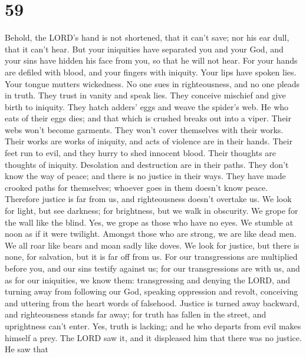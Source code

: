 \hypertarget{section-56}{%
\section{59}\label{section-56}}

 Behold, the LORD's hand is not shortened, that it can't
save; nor his ear dull, that it can't hear.  But your
iniquities have separated you and your God, and your sins have hidden
his face from you, so that he will not hear.  For your hands
are defiled with blood, and your fingers with iniquity. Your lips have
spoken lies. Your tongue mutters wickedness.  No one sues in
righteousness, and no one pleads in truth. They trust in vanity and
speak lies. They conceive mischief and give birth to iniquity.
 They hatch adders' eggs and weave the spider's web. He who
eats of their eggs dies; and that which is crushed breaks out into a
viper.  Their webs won't become garments. They won't cover
themselves with their works. Their works are works of iniquity, and acts
of violence are in their hands.  Their feet run to evil, and
they hurry to shed innocent blood. Their thoughts are thoughts of
iniquity. Desolation and destruction are in their paths. 
They don't know the way of peace; and there is no justice in their ways.
They have made crooked paths for themselves; whoever goes in them
doesn't know peace.  Therefore justice is far from us, and
righteousness doesn't overtake us. We look for light, but see darkness;
for brightness, but we walk in obscurity.  We grope for the
wall like the blind. Yes, we grope as those who have no eyes. We stumble
at noon as if it were twilight. Amongst those who are strong, we are
like dead men.  We all roar like bears and moan sadly like
doves. We look for justice, but there is none, for salvation, but it is
far off from us.  For our transgressions are multiplied
before you, and our sins testify against us; for our transgressions are
with us, and as for our iniquities, we know them: 
transgressing and denying the LORD, and turning away from following our
God, speaking oppression and revolt, conceiving and uttering from the
heart words of falsehood.  Justice is turned away backward,
and righteousness stands far away; for truth has fallen in the street,
and uprightness can't enter.  Yes, truth is lacking; and he
who departs from evil makes himself a prey. The LORD saw it, and it
displeased him that there was no justice.  He saw that
